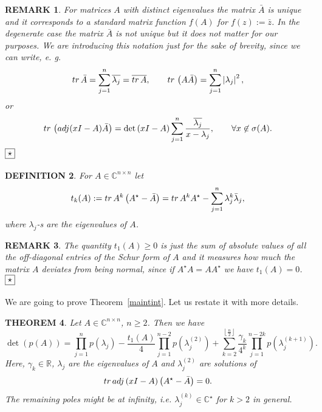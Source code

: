 \documentclass[10pt,a4paper,reqno]{amsart}
\newtheorem{defi}{\bf D\scriptsize EFINITION \normalsize}
\newtheorem{theorem}[defi]{\bf T\scriptsize HEOREM \normalsize}
\newtheorem{rem}[defi]{\bf R\scriptsize EMARK \normalsize}
\def\kopr{\hfill\raisebox{3pt}{\framebox{$\star$}}}
\newenvironment{remark}{\begin{rem}\rm}{$\kopr$\end{rem}}
\newenvironment{definition}{\begin{defi}\rm}{\end{defi}}
\newcommand{\zav}[1]{\left( #1 \right)}
\newcommand{\abs}[1]{\left| #1 \right|}
\newcommand{\deter}[1]{\det\zav{#1}}
\newcommand{\tr}{{\rm tr}\,}
\newcommand{\trunc}[1]{\left\lfloor #1 \right\rfloor}
\begin{document}
%
\begin{remark}  
For matrices $A$ with distinct eigenvalues the matrix $\bar A$ is unique and it corresponds to a standard matrix function $f(A)$ for $f(z):=\bar z$. In the degenerate case the matrix $\bar A$ is not unique but it does not matter for our purposes.  We are introducing this notation just for the sake of brevity, since we can write, e. g.
$$
\tr \bar A=\sum_{j=1}^n \overline{\lambda_j}=\overline{\tr A},\qquad \tr \zav{A\bar A}=\sum_{j=1}^n\abs{\lambda_j}^2, 
$$
or
$$
\tr \zav{{\rm adj }(xI-A)\bar A}=\deter{xI-A}\sum_{j=1}^n\frac{\overline{\lambda_j}}{x-\lambda_j},\qquad \forall x\not\in\sigma(A). 
$$
\end{remark}
\begin{definition}
For $A\in\mathbb{C}^{n\times n}$ let
$$
t_k(A):=\tr A^k\zav{A^\star -\bar A}=\tr A^k A^\star-\sum_{j=1}^n \lambda_j^k\bar \lambda_j,
$$
where $\lambda_j$-s are the eigenvalues of $A$.
\end{definition}
\begin{remark}
The quantity $t_1(A)\geq 0$ is just the sum of absolute values of all the off-diagonal entries of the Schur form of $A$ and it measures how much the matrix $A$ deviates from being normal, since if $A^\star A=AA^\star$ we have $t_1(A)=0$. 
\end{remark}
We are going to prove Theorem~\ref{maintint}. Let us restate it with more details.
\begin{theorem}\label{maint}
Let $A\in\mathbb{C}^{n\times n}$, $n\geq 2$. Then we have
\begin{equation}\label{covalpa}
\deter{p(A)}=\prod_{j=1}^{n}p(\lambda_j)-\frac{t_1(A)}{4}\prod_{j=1}^{n-2}p\zav{\lambda^{(2)}_j}+\sum_{k=2}^{\trunc{\frac{n}{2}}}\frac{\gamma_k}{4^k}\prod_{j=1}^{n-2k}p\zav{\lambda^{(k+1)}_{j}}.
\end{equation}
Here, $\gamma_k\in \mathbb{R}$,  $\lambda_j$ are the eigenvalues of $A$ and $\lambda^{(2)}_j$ are solutions of 
\begin{equation}\label{anticharacteristiceq}
\tr {\rm adj}\zav{x I-A}\zav{A^\star-\bar A}=0.
\end{equation}
The remaining poles might be at infinity, i.e. $\lambda_{j}^{(k)}\in \mathbb{C}^\star$ for $k>2$ in general. 
\end{theorem}
\end{document}
